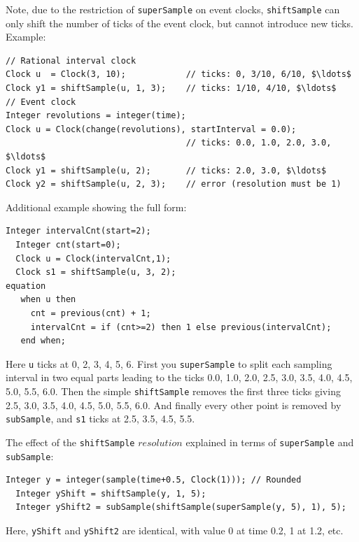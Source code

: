 \begin{operatordefinition}[shiftSample]
\begin{semantics}
\begin{nonnormative}
Note, due to the restriction of \lstinline!superSample! on event clocks, \lstinline!shiftSample! can only shift the number of ticks of the event clock, but cannot introduce new ticks.
Example:
\begin{lstlisting}[language=modelica]
// Rational interval clock
Clock u  = Clock(3, 10);            // ticks: 0, 3/10, 6/10, $\ldots$
Clock y1 = shiftSample(u, 1, 3);    // ticks: 1/10, 4/10, $\ldots$
// Event clock
Integer revolutions = integer(time);
Clock u = Clock(change(revolutions), startInterval = 0.0);
                                    // ticks: 0.0, 1.0, 2.0, 3.0, $\ldots$
Clock y1 = shiftSample(u, 2);       // ticks: 2.0, 3.0, $\ldots$
Clock y2 = shiftSample(u, 2, 3);    // error (resolution must be 1)
\end{lstlisting}
Additional example showing the full form:
\begin{lstlisting}[language=modelica]
  Integer intervalCnt(start=2);
  Integer cnt(start=0);
  Clock u = Clock(intervalCnt,1);
  Clock s1 = shiftSample(u, 3, 2);
equation
   when u then
     cnt = previous(cnt) + 1;
     intervalCnt = if (cnt>=2) then 1 else previous(intervalCnt);
   end when;
\end{lstlisting}
Here \lstinline!u! ticks at 0, 2, 3, 4, 5, 6.
First you \lstinline!superSample! to split each sampling interval in two equal parts leading to the ticks 0.0, 1.0, 2.0, 2.5, 3.0, 3.5, 4.0, 4.5, 5.0, 5.5, 6.0.
Then the simple \lstinline!shiftSample! removes the first three ticks giving 2.5, 3.0, 3.5, 4.0, 4.5, 5.0, 5.5, 6.0.
And finally every other point is removed by \lstinline!subSample!, and \lstinline!s1! ticks at 2.5, 3.5, 4.5, 5.5.
\end{nonnormative}
\begin{example}
The effect of the \lstinline!shiftSample! $\mathit{resolution}$ explained in terms of \lstinline!superSample! and \lstinline!subSample!:
\begin{lstlisting}[language=modelica]
  Integer y = integer(sample(time+0.5, Clock(1))); // Rounded
  Integer yShift = shiftSample(y, 1, 5);
  Integer yShift2 = subSample(shiftSample(superSample(y, 5), 1), 5);
\end{lstlisting}
Here, \lstinline!yShift! and \lstinline!yShift2! are identical, with value 0 at time 0.2, 1 at 1.2, etc.
\end{example}
\end{semantics}
\end{operatordefinition}

